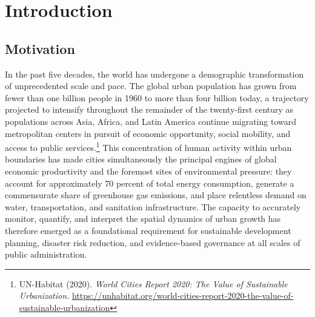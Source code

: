 \chapter{Introduction}

\section{Motivation}

In the past five decades, the world has undergone a demographic transformation
of unprecedented scale and pace. The global urban population has grown from fewer
than one billion people in 1960 to more than four billion today, a trajectory
projected to intensify throughout the remainder of the twenty-first century as
populations across Asia, Africa, and Latin America continue migrating toward
metropolitan centers in pursuit of economic opportunity, social mobility, and
access to public services.\footnote{UN-Habitat (2020). \textit{World Cities
Report 2020: The Value of Sustainable Urbanization.}
\url{https://unhabitat.org/world-cities-report-2020-the-value-of-sustainable-urbanization}}
This concentration of human activity within urban boundaries has made cities
simultaneously the principal engines of global economic productivity and the
foremost sites of environmental pressure: they account for approximately 70
percent of total energy consumption, generate a commensurate share of greenhouse
gas emissions, and place relentless demand on water, transportation, and
sanitation infrastructure. The capacity to accurately monitor, quantify, and
interpret the spatial dynamics of urban growth has therefore emerged as a
foundational requirement for sustainable development planning, disaster risk
reduction, and evidence-based governance at all scales of public administration.

